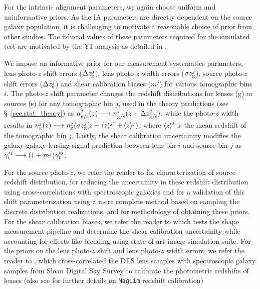 \documentclass[aps, prd,twocolumn,superscriptaddress,nofootinbib,preprintnumbers]{revtex4-1}
\newcommand{\maglim}{\texttt{MagLim} }
\begin{document}
For the intrinsic alignment parameters, we again choose uniform and uninformative priors. As the IA parameters are directly dependent on the source galaxy population, it is challenging to motivate a reasonable choice of prior from other studies. The fiducial values of these parameters required for the simulated test are motivated by the Y1 analysis as detailed in \cite{Samuroff_2019}.

We impose an informative prior for our measurement systematics parameters, lens photo-$z$ shift errors ($\Delta z^j_{\rm g}$), lens photo-$z$ width errors ($\sigma z^j_{\rm g}$), source photo-$z$ shift errors ($\Delta z^j_{\rm s}$) and shear calibration biases ($m^j$) for various tomographic bins $i$. The photo-$z$ shift parameter changes the redshift distributions for lenses (g) or sources (s) for any tomographic bin $j$, used in the theory predictions (see \S~\ref{sec:stat_theory}) as $n^j_{\rm g/s}(z) \longrightarrow n^j_{\rm g/s}(z - \Delta z^j_{\rm g/s})$, while the photo-$z$ width results in  $n^j_{\rm g}(z) \longrightarrow n^j_{\rm g}(\sigma z^j_{\rm g}[z - \langle z \rangle^j] + \langle z \rangle^j)$, where $\langle z \rangle^j$ is the mean redshift of the tomographic bin $j$. Lastly, the shear calibration uncertainity modifies the galaxy-galaxy lensing signal prediction between lens bin $i$ and source bin $j$ as $\gamma^{ij}_{\rm t} \longrightarrow (1 + m^j)\gamma^{ij}_{\rm t}$. 


For the source photo-$z$, we refer the reader to \citet*{y3-sompz} for characterization of source redshift distribution, \citet*{y3-sourcewz} for reducing the uncertainity in these redshift distribution using cross-correlations with spectroscopic galaxies and \citet*{y3-hyperrank} for a validation of this shift parameterization using a more complete method based on sampling the discrete distribution realizations. \citet*{y3-imagesims} and \citet*{y3-sompz} for methodology of obtaining these priors. For the shear calibration biases, we refer the reader to \citet*{y3-imagesims} which tests the shape measurement pipeline and determine the shear calibration uncertainity while accounting for effects like blending using state-of-art image simulation suite. For the priors on the lens photo-$z$ shift and lens photo-$z$ width errors, we refer the reader to \citet*{y3-lenswz}, which cross-correlated the DES lens samples with spectroscopic galaxy samples from Sloan Digital Sky Survey to calibrate the photometric redshifts of lenses (also see \citet*{y3-2x2ptaltlenssompz} for further details on \maglim redshift calibration)
\end{document}
